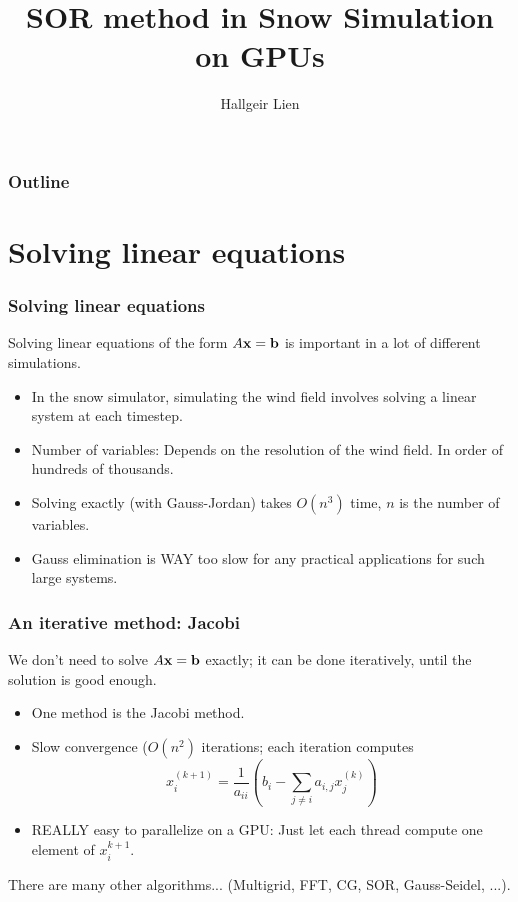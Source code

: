 \usepackage{style}
\usepackage{url}

\title[SOR in Snow Simulation]{SOR method in Snow Simulation on GPUs}
\author{Hallgeir Lien}


\maketitle

\AtBeginSection{
    \begin{frame}
    \tableofcontents[currentsection]
    \end{frame}
}

\begin{frame}
\frametitle{Outline}
\tableofcontents
\end{frame}



\section{Solving linear equations}
\begin{frame}
\frametitle{Solving linear equations}
Solving linear equations of the form $A\bf{x} = \bf{b}$ is important in a lot of different simulations.

\begin{itemize}
\item In the snow simulator, simulating the wind field involves solving a linear system at each timestep.
\item Number of variables: Depends on the resolution of the wind field. In order of hundreds of thousands.
\item Solving exactly (with Gauss-Jordan) takes $O(n^3)$ time, $n$ is the number of variables.
\item Gauss elimination is WAY too slow for any practical applications for such large systems.
\end{itemize}

\end{frame}

\begin{frame}
\frametitle{An iterative method: Jacobi}
We don't need to solve $A\bf{x} = \bf{b}$ exactly; it can be done iteratively, until the solution is good enough.
\begin{itemize}
\item One method is the Jacobi method.
\item Slow convergence ($O(n^2)$ iterations; each iteration computes
$$
x_i^{(k+1)} = \frac{1}{a_{ii}}\left(b_i-\sum_{j\neq i} a_{i,j}x_j^{(k)}\right)
$$
\item REALLY easy to parallelize on a GPU: Just let each thread compute one element of $x_i^{k+1}$.
\end{itemize}

There are many other algorithms... (Multigrid, FFT, CG, SOR, Gauss-Seidel, ...).
\end{frame}

